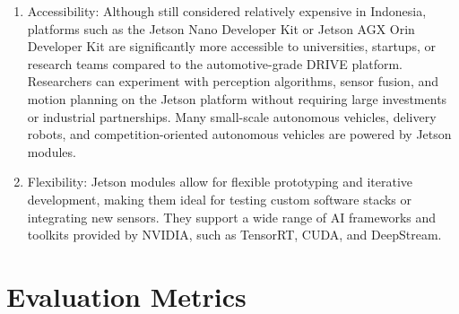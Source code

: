 \begin{enumerate}[nolistsep]
    \item Accessibility: Although still considered relatively expensive in Indonesia, platforms such as the Jetson Nano Developer Kit or Jetson AGX Orin Developer Kit are significantly more accessible to universities, startups, or research teams compared to the automotive-grade DRIVE platform. Researchers can experiment with perception algorithms, sensor fusion, and motion planning on the Jetson platform without requiring large investments or industrial partnerships. Many small-scale autonomous vehicles, delivery robots, and competition-oriented autonomous vehicles are powered by Jetson modules.
    \item Flexibility: Jetson modules allow for flexible prototyping and iterative development, making them ideal for testing custom software stacks or integrating new sensors. They support a wide range of AI frameworks and toolkits provided by NVIDIA, such as TensorRT, CUDA, and DeepStream.
\end{enumerate}







\section{Evaluation Metrics}

